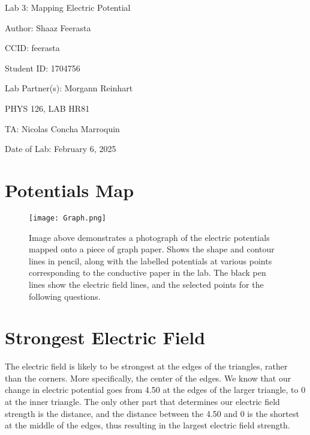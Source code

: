 \documentclass[12pt]{article}
\begin{document}
\pagebreak

\begin{titlepage}
    \begin{center}
        \vspace*{\fill}
        Lab 3: Mapping Electric Potential

        Author: Shaaz Feerasta

        CCID: feerasta

        Student ID: 1704756

        Lab Partner(s): Morgann Reinhart

        PHYS 126, LAB HR81

        TA: Nicolas Concha Marroquin

        Date of Lab: February 6, 2025
        \vspace*{\fill}
    \end{center}
\end{titlepage}

\section{Potentials Map}

\begin{figure}[h]
    \centering
    \texttt{[image: Graph.png]}
    \caption{Image above demonstrates a photograph of the electric potentials mapped onto a piece of graph paper.
            Shows the shape and contour lines in pencil, along with the labelled potentials at various points
            corresponding to the conductive paper in the lab. The black pen lines show the electric field lines, and the
            selected points for the following questions.}
    \label{fig:diagram}
\end{figure}

\section{Strongest Electric Field}

The electric field is likely to be strongest at the edges of the triangles, rather than the corners. More specifically, the center of the edges.
We know that our change in electric potential goes from 4.50 at the edges of the larger triangle, to 0 at the inner triangle.
The only other part that determines our electric field strength is the distance, and the distance between the 4.50 and 0 is the shortest
at the middle of the edges, thus resulting in the largest electric field strength.
\end{document}
